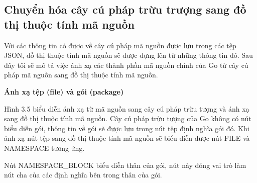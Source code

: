 \subsection{Chuyển hóa cây cú pháp trừu trượng sang đồ thị thuộc tính mã nguồn}

Với các thông tin có được về cây cú pháp mã nguồn được lưu trong các tệp JSON,
đồ thị thuộc tính mã nguồn sẽ được dựng lên từ những thông tin đó. Sau đây tôi sẽ mô
tả việc ánh xạ các thành phần mã nguồn chính của Go từ cây cú pháp mã nguồn sang đồ
thị thuộc tính mã nguồn.

\textbf{Ánh xạ tệp (file) và gói (package)}

Hình 3.5 biểu diễn ánh xạ từ mã nguồn sang cây cú pháp trừu tượng và ánh xạ sang đồ thị thuộc tính mã nguồn. Cây cú pháp trừu tượng của Go không có nút biểu diễn gói, thông tin về gói sẽ được lưu trong nút tệp định nghĩa gói đó. Khi ánh xạ nút tệp sang đồ thị thuộc tính mã nguồn sẽ biểu diễn được nút FILE và NAMESPACE tương ứng.

Nút NAMESPACE\_BLOCK biểu diễn thân của gói, nút này đóng vai trò làm nút cha của các định nghĩa bên trong thân của gói.